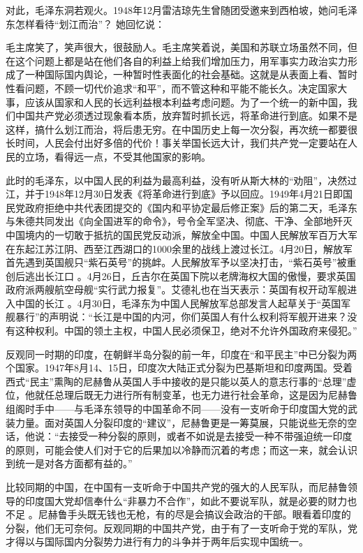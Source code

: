 \documentclass[UTF8, 12pt, a4paper]{ctexrep}
\begin{document}
对此，毛泽东洞若观火。1948年12月雷洁琼先生曾随团受邀来到西柏坡，她问毛泽东怎样看待“划江而治”？ 她回忆说：

毛主席笑了，笑声很大，很鼓励人。毛主席笑着说，美国和苏联立场虽然不同，但在这个问题上都是站在他们各自的利益上给我们增加压力，用军事实力政治实力形成了一种国际国内舆论，一种暂时性表面化的社会基础。这就是从表面上看、暂时性看问题，不顾一切代价追求“和平”，而不管这种和平能不能长久。决定国家大事，应该从国家和人民的长远利益根本利益考虑问题。为了一个统一的新中国，我们中国共产党必须透过现象看本质，放弃暂时抓长远，将革命进行到底。如果不是这样，搞什么划江而治，将后患无穷。在中国历史上每一次分裂，再次统一都要很长时间，人民会付出好多倍的代价！事关举国长远大计，我们共产党一定要站在人民的立场，看得远一点，不受其他国家的影响。

此时的毛泽东，以中国人民的利益为最高利益，没有听从斯大林的“劝阻”，决然过江，并于1948年12月30日发表《将革命进行到底》予以回应。1949年4月21日即国民党政府拒绝中共代表团提交的《国内和平协定最后修正案》后的第二天，毛泽东与朱德共同发出《向全国进军的命令》，号令全军坚决、彻底、干净、全部地歼灭中国境内的一切敢于抵抗的国民党反动派，解放全中国。中国人民解放军百万大军在东起江苏江阴、西至江西湖口的1000余里的战线上渡过长江。4月20日，解放军首先遇到英国舰只“紫石英号”的挑衅。人民解放军予以坚决打击，“紫石英号”被重创后逃出长江口 。4月26日，丘吉尔在英国下院以老牌海权大国的傲慢，要求英国政府派两艘航空母舰“实行武力报复”。艾德礼也在当天表示：英国有权开动军舰进入中国的长江 。4月30日，毛泽东为中国人民解放军总部发言人起草关于“英国军舰暴行”的声明说：“长江是中国的内河，你们英国人有什么权利将军舰开进来？没有这种权利。中国的领土主权，中国人民必须保卫，绝对不允许外国政府来侵犯。”

反观同一时期的印度，在朝鲜半岛分裂的前一年，印度在“和平民主”中已分裂为两个国家。1947年8月14、15日，印度次大陆正式分裂为巴基斯坦和印度两国。受着西式“民主”熏陶的尼赫鲁从英国人手中接收的是只能以英人的意志行事的“总理”虚位，他就任总理后既无力进行所有制变革，也无力进行社会革命，这是因为尼赫鲁组阁时手中——与毛泽东领导的中国革命不同——没有一支听命于印度国大党的武装力量。面对英国人分裂印度的“建议”，尼赫鲁更是一筹莫展，只能说些无奈的空话，他说：“去接受一种分裂的原则，或者不如说是去接受一种不带强迫统一印度的原则，可能会使人们对于它的后果加以冷静而沉着的考虑；而这一来，就会认识到统一是对各方面都有益的。”

比较同期的中国，在中国有一支听命于中国共产党的强大的人民军队，而尼赫鲁领导的印度国大党却信奉什么“非暴力不合作”，如此不要说军队，就是必要的财力也不足 。尼赫鲁手头既无钱也无枪，有的尽是会搞议会政治的干部。眼看着印度的分裂，他们无可奈何。反观同期的中国共产党，由于有了一支听命于党的军队，党才得以与国际国内分裂势力进行有力的斗争并于两年后实现中国统一。
\end{document}
